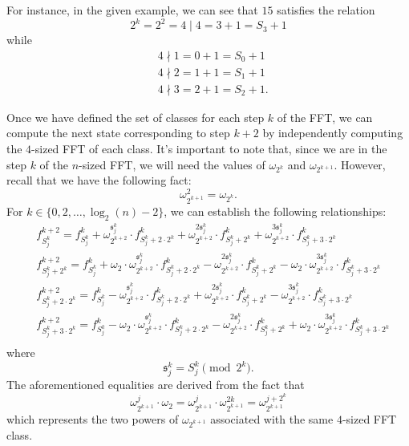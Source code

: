 For instance, in the given example, we can see that $15$ satisfies the relation
\[
2^k = 2^2 = 4 \mid 4 = 3 + 1 = S_{3} + 1
\]
while
\begin{align*}
& 4 \nmid 1 = 0 + 1 = S_{0} + 1 \\
& 4 \nmid 2 = 1 + 1 = S_{1} + 1 \\
& 4 \nmid 3 = 2 + 1 = S_{2} + 1.
\end{align*}

Once we have defined the set of classes for each step $k$ of the FFT, we can compute the next state corresponding to step $k + 2$ by independently computing the $4$-sized FFT of each class. It's important to note that, since we are in the step $k$ of the $n$-sized FFT, we will need the values of $\omega_{2^k}$ and $\omega_{2^{k+1}}$. However, recall that we have the following fact:
\[
\omega_{2^{k+1}}^2 = \omega_{2^{k}}.
\]
For $k \in \{ 0, 2, \dots, \log_2(n) - 2 \}$, we can establish the following relationships:
\begin{align*}
& f_{S_j^k}^{k+2} = f_{S_j^k}^k + \omega_{2^{k+2}}^{\mathfrak{s}_j^k} \cdot f_{S_j^k + 2 \cdot 2^k}^k + \omega_{2^{k+2}}^{2{\mathfrak{s}_j^k}} \cdot f_{S_j^k + 2^k}^k + \omega_{2^{k+2}}^{3{\mathfrak{s}_j^k}} \cdot f_{S_j^k + 3 \cdot 2^k}^k \\
& f_{S_j^k + 2^{k}}^{k+2} = f_{S_j^k}^k + \omega_2 \cdot \omega_{2^{k+2}}^{\mathfrak{s}_j^k} \cdot f_{S_j^k + 2 \cdot 2^k}^k - \omega_{2^{k+2}}^{2{\mathfrak{s}_j^k}} \cdot f_{S_j^k + 2^k}^k  - \omega_2 \cdot \omega_{2^{k+2}}^{3{\mathfrak{s}_j^k}} \cdot f_{S_j^k + 3 \cdot 2^k}^k \\
& f_{S_j^k + 2 \cdot 2^{k}}^{k+2} = f_{S_j^k}^k - \omega_{2^{k+2}}^{\mathfrak{s}_j^k} \cdot f_{S_j^k + 2 \cdot 2^k}^k + \omega_{2^{k+2}}^{2{\mathfrak{s}_j^k}} \cdot f_{S_j^k + 2^k}^k - \omega_{2^{k+2}}^{3{\mathfrak{s}_j^k}} \cdot f_{S_j^k + 3 \cdot 2^k}^k \\
& f_{S_j^k + 3 \cdot 2^{k}}^{k+2} = f_{S_j^k}^k - \omega_2 \cdot \omega_{2^{k+2}}^{\mathfrak{s}_j^k} \cdot f_{S_j^k + 2 \cdot 2^k}^k - \omega_{2^{k+2}}^{2{\mathfrak{s}_j^k}} \cdot f_{S_j^k + 2^k}^k + \omega_2 \cdot \omega_{2^{k+2}}^{3{\mathfrak{s}_j^k}} \cdot f_{S_j^k + 3 \cdot 2^k}^k \\
\end{align*}
where 
\[
\mathfrak{s}_j^k = S_j^k \pmod{2^{k}}.
\]
The aforementioned equalities are derived from the fact that
\[
\omega^{j}_{2^{k+1}} \cdot \omega_2 = \omega^j_{2^{k+1}} \cdot \omega_{2^{k+1}}^{2k} =  \omega_{2^{k+1}}^{j + 2^k}
\]
which represents the two powers of $\omega_{2^{k+1}}$ associated with the same $4$-sized FFT class.

